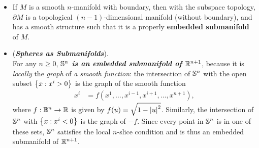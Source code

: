 \documentclass[11pt]{article}
\begin{document}
\begin{itemize}
\item \begin{theorem}
If $M$ is a smooth $n$-manifold with boundary, then with the subspace topology, $\partial M$ is a topological $(n-1)$-dimensional manifold (without boundary), and has a smooth structure such that it is a properly \textbf{embedded submanifold} of $M$.
\end{theorem}

\item \begin{example} (\emph{\textbf{Spheres as Submanifolds}}).\\
For any $n \ge 0$, \emph{\textbf{${\mathbb S}^n$ is an embedded submanifold of ${\mathbb R}^{n+1}$}}, because it is \emph{locally} the \emph{graph} of \emph{a smooth function}:  the intersection of ${\mathbb S}^n$ with the open subset $\left\{x: x^i > 0\right\}$ is the graph of the smooth function
\begin{align*}
x^i &= f(x^1,\ldots,x^{i-1}, x^{i+1},\ldots,x^{n+1}),
\end{align*} where $f: {\mathbb B}^n \rightarrow {\mathbb R}$ is given by $f(u) = \sqrt{1 - \left\lvert u \right\rvert^2}$. Similarly, the intersection of ${\mathbb S}^n$ with $\left\{x: x^i < 0\right\}$ is the graph of $-f$. Since every point in ${\mathbb S}^n$ is in one of these sets, ${\mathbb S}^n$ satisfies the local $n$-slice condition and is thus an embedded submanifold of ${\mathbb R}^{n+1}$. 
\end{example}
\end{itemize}
\end{document}
